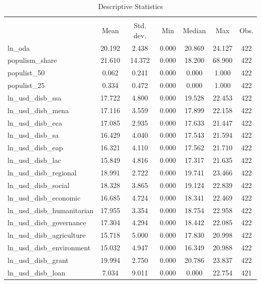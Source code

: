 \begin{table}[htbp]\centering
\def\sym#1{\ifmmode^{#1}\else\(^{#1}\)\fi}
\caption{Descriptive Statistics}
\begin{tabular}{l*{1}{cccccc}}
\toprule
                    &\multicolumn{6}{c}{}                                                         \\
                    &        Mean&   Std. dev.&         Min&      Median&         Max&        Obs.\\
\midrule
ln\_oda              &      20.192&       2.438&       0.000&      20.869&      24.127&         422\\
populism\_share      &      21.610&      14.372&       0.000&      18.200&      68.900&         422\\
populist\_50         &       0.062&       0.241&       0.000&       0.000&       1.000&         422\\
populist\_25         &       0.334&       0.472&       0.000&       0.000&       1.000&         422\\
ln\_usd\_disb\_ssa     &      17.722&       4.800&       0.000&      19.528&      22.453&         422\\
ln\_usd\_disb\_mena    &      17.116&       3.559&       0.000&      17.899&      22.158&         422\\
ln\_usd\_disb\_eca     &      17.085&       2.935&       0.000&      17.633&      21.447&         422\\
ln\_usd\_disb\_sa      &      16.429&       4.040&       0.000&      17.543&      21.594&         422\\
ln\_usd\_disb\_eap     &      16.321&       4.110&       0.000&      17.562&      21.710&         422\\
ln\_usd\_disb\_lac     &      15.849&       4.816&       0.000&      17.317&      21.635&         422\\
ln\_usd\_disb\_regional&      18.991&       2.722&       0.000&      19.741&      23.466&         422\\
ln\_usd\_disb\_social  &      18.328&       3.865&       0.000&      19.124&      22.839&         422\\
ln\_usd\_disb\_economic&      16.685&       4.724&       0.000&      18.341&      22.469&         422\\
ln\_usd\_disb\_humanitarian&      17.955&       3.354&       0.000&      18.754&      22.958&         422\\
ln\_usd\_disb\_governance&      17.304&       4.294&       0.000&      18.442&      22.085&         422\\
ln\_usd\_disb\_agriculture&      15.718&       5.000&       0.000&      17.830&      20.998&         422\\
ln\_usd\_disb\_environment&      15.032&       4.947&       0.000&      16.349&      20.988&         422\\
ln\_usd\_disb\_grant   &      19.994&       2.750&       0.000&      20.786&      23.837&         422\\
ln\_usd\_disb\_loan    &       7.034&       9.011&       0.000&       0.000&      22.754&         421\\
\bottomrule
\end{tabular}
\end{table}

